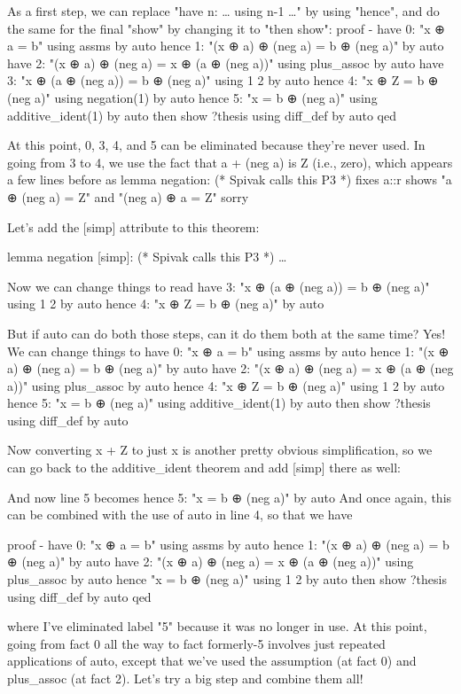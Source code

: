As a first step, we can replace "have n: … using n-1 …" by using "hence", and do the same for the final "show" by changing it to "then show":
proof -
  have 0: "x ⊕ a = b" using assms by auto
  hence 1: "(x ⊕ a) ⊕ (neg a) = b ⊕ (neg a)" by auto
  have 2: "(x ⊕ a) ⊕ (neg a) = x ⊕ (a ⊕ (neg a))" using plus_assoc by auto
  have 3: "x ⊕ (a ⊕ (neg a)) = b ⊕ (neg a)" using 1 2 by auto
  hence 4: "x ⊕ Z = b ⊕ (neg a)" using negation(1) by auto
  hence 5: "x = b ⊕ (neg a)" using additive_ident(1) by auto
  then show ?thesis using diff_def by auto
qed

At this point, 0, 3, 4, and 5 can be eliminated because they're never used. In going from 3 to 4, we use the fact that a + (neg a) is Z (i.e., zero), which appears a few lines before as 
lemma  negation: (* Spivak calls this P3 *)
  fixes a::r
  shows "a ⊕ (neg a) =  Z"
  and  "(neg a) ⊕ a =  Z"
  sorry

Let's add the [simp] attribute to this theorem:

lemma  negation [simp]: (* Spivak calls this P3 *)
…

Now we can change things to read
have 3: "x ⊕ (a ⊕ (neg a)) = b ⊕ (neg a)" using 1 2 by auto
hence 4: "x ⊕ Z = b ⊕ (neg a)" by auto

But if auto can do both those steps, can it do them both at the same time? Yes! We can change things to 
  have 0: "x ⊕ a = b" using assms by auto
  hence 1: "(x ⊕ a) ⊕ (neg a) = b ⊕ (neg a)" by auto
  have 2: "(x ⊕ a) ⊕ (neg a) = x ⊕ (a ⊕ (neg a))" using plus_assoc by auto
  hence 4: "x ⊕ Z = b ⊕ (neg a)" using 1 2  by auto
  hence 5: "x = b ⊕ (neg a)" using additive_ident(1) by auto
  then show ?thesis using diff_def by auto

Now converting x + Z to just x is another pretty obvious simplification, so we can go back to the additive_ident theorem and add [simp] there as well:

And now line 5 becomes
 hence 5: "x = b ⊕ (neg a)" by auto
And once again, this can be combined with the use of auto in line 4, so that we have

proof -
  have 0: "x ⊕ a = b" using assms by auto
  hence 1: "(x ⊕ a) ⊕ (neg a) = b ⊕ (neg a)" by auto
  have 2: "(x ⊕ a) ⊕ (neg a) = x ⊕ (a ⊕ (neg a))" using plus_assoc by auto
  hence "x = b ⊕ (neg a)" using 1 2 by auto
  then show ?thesis using diff_def by auto
qed

where I've eliminated label "5" because it was no longer in use. At this point, going from fact 0 all the way to fact formerly-5 involves just repeated applications of auto, except that we've used the assumption (at fact 0) and plus_assoc (at fact 2). Let's try a big step and combine them all!



